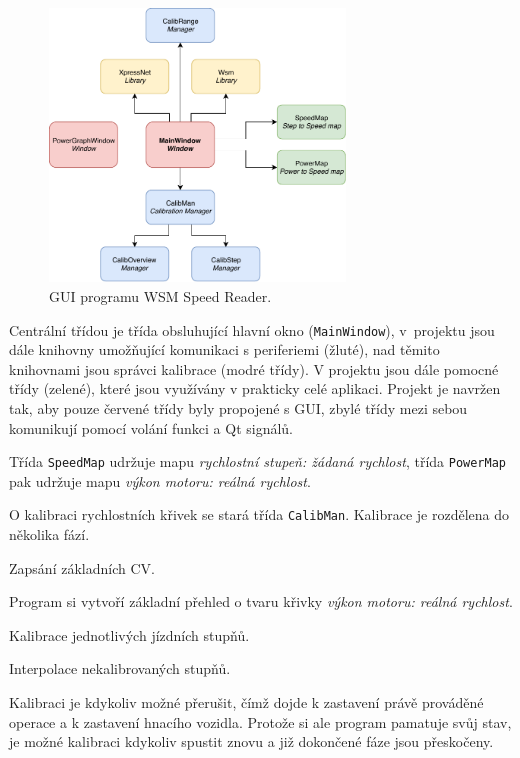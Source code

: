 \begin{figure}[h]
\includegraphics[width=0.7\textwidth]{data/ac_classes.pdf}
\caption{GUI programu WSM Speed Reader.}
\label{fig:ac-classes}
\end{figure}

Centrální třídou je třída obsluhující hlavní okno (\texttt{MainWindow}),
v~projektu jsou dále knihovny umožňující komunikaci s periferiemi (žluté),
nad těmito knihovnami jsou správci kalibrace (modré třídy). V projektu jsou
dále pomocné třídy (zelené), které jsou využívány v prakticky celé aplikaci.
Projekt je navržen tak, aby pouze červené třídy byly propojené s GUI, zbylé
třídy mezi sebou komunikují pomocí volání funkci a Qt signálů.

Třída \texttt{SpeedMap} udržuje mapu \textit{rychlostní stupeň: žádaná rychlost},
třída \texttt{PowerMap} pak udržuje mapu \textit{výkon motoru: reálná rychlost}.

O kalibraci rychlostních křivek se stará třída \texttt{CalibMan}. Kalibrace
je rozdělena do několika fází.

\begin{compactenum}
\item Zapsání základních CV.
\item Program si vytvoří základní přehled o tvaru křivky \textit{výkon motoru:
      reálná rychlost}.
\item Kalibrace jednotlivých jízdních stupňů.
\item Interpolace nekalibrovaných stupňů.
\end{compactenum}

Kalibraci je kdykoliv možné přerušit, čímž dojde k zastavení právě prováděné
operace a k zastavení hnacího vozidla. Protože si ale program pamatuje svůj
stav, je možné kalibraci kdykoliv spustit znovu a již dokončené fáze jsou
přeskočeny.

